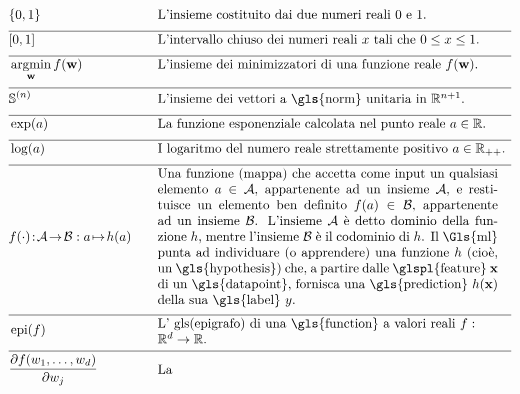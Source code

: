\newpage
\begin{align}
		&\{0,1\}& \quad & \mbox{L'insieme costituito dai due numeri reali $0$ e $1$.} \nonumber \\[2mm] \hline \nonumber\\[-5mm]
	&[0,1] &\quad &\mbox{L'intervallo chiuso dei numeri reali $x$ tali che $0 \leq x \leq 1$. }\nonumber \\[2mm] \hline \nonumber\\[-5mm]
    &\argmin_{\weights} f(\weights) &\quad &\mbox{L'insieme dei minimizzatori di una funzione reale $f(\weights)$.  } \nonumber \\[2mm] \hline \nonumber\\[-5mm]
    &\sphere{\nrnodes} &\quad &\mbox{L'insieme dei vettori a \gls{norm} unitaria in $\mathbb{R}^{\nrnodes+1}$.  }\nonumber \\[2mm] \hline \nonumber\\[-5mm]
      & \exp(a) & \quad & \mbox{La funzione esponenziale calcolata nel punto reale $a \in \mathbb{R}$.} \nonumber \\[2mm] \hline \nonumber \\[-5mm]
	 &\log(a) &\quad &\mbox{I logaritmo del numero reale strettamente positivo $a \in \mathbb{R}_{++}$.  } \nonumber \\[2mm] \hline \nonumber\\[-5mm]
	 &f(\cdot)\!:\!\mathcal{A}\!\rightarrow\!\mathcal{B} :  a \!\mapsto\!h(a) &\quad &\parbox{.75\textwidth}{
	 	Una funzione (mappa) che accetta come input un qualsiasi elemento $a \in \mathcal{A}$, appartenente ad un insieme $\mathcal{A}$, e restituisce un elemento ben definito $f(a) \in \mathcal{B}$, appartenente ad un insieme $\mathcal{B}$. 
	 	L'insieme $\mathcal{A}$ è detto dominio della funzione $h$, mentre l'insieme $\mathcal{B}$ è il codominio di $\hypothesis$. Il \Gls{ml} punta ad individuare (o apprendere) una funzione $\hypothesis$ (cioè, un \gls{hypothesis}) che, a partire dalle \glspl{feature} $\featurevec$ di un \gls{datapoint}, fornisca una \gls{prediction} $\hypothesis(\featurevec)$
	 	della sua \gls{label} $\truelabel$.} \nonumber \\[2mm] \hline \nonumber\\[-5mm]
		&\operatorname{epi}(f)  & \quad & \parbox{.70\textwidth}{L' gls(epigrafo) di una \gls{function} a valori reali 
	 	$f: \mathbb{R}^{\featuredim}\rightarrow \mathbb{R}$. } \nonumber \\[2mm]  \hline \nonumber\\[-5mm]
	&  \frac{\partial f(\weight_{1},\ldots,\weight_{\nrfeatures})}{\partial \weight_{\featureidx}} & \quad & \parbox{.70\textwidth}{La 
}
\end{align}
